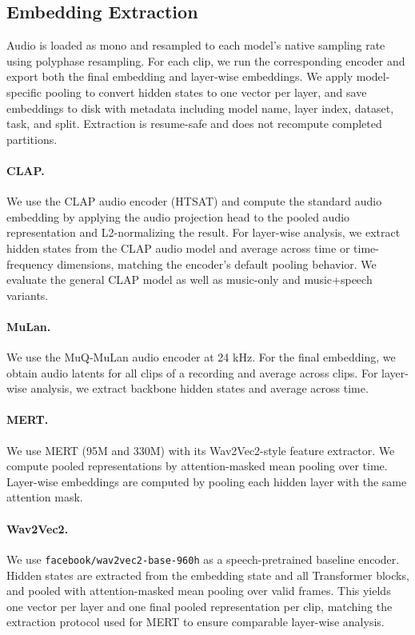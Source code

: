 \subsection{Embedding Extraction}
Audio is loaded as mono and resampled to each model's native sampling rate using polyphase resampling. For each clip, we run the corresponding encoder and export both the final embedding and layer-wise embeddings. We apply model-specific pooling to convert hidden states to one vector per layer, and save embeddings to disk with metadata including model name, layer index, dataset, task, and split. Extraction is resume-safe and does not recompute completed partitions.

\paragraph{CLAP.}
We use the CLAP audio encoder (HTSAT) and compute the standard audio embedding by applying the audio projection head to the pooled audio representation and L2-normalizing the result. For layer-wise analysis, we extract hidden states from the CLAP audio model and average across time or time-frequency dimensions, matching the encoder's default pooling behavior. We evaluate the general CLAP model as well as music-only and music+speech variants.

\paragraph{MuLan.}
We use the MuQ-MuLan audio encoder at 24 kHz. For the final embedding, we obtain audio latents for all clips of a recording and average across clips. For layer-wise analysis, we extract backbone hidden states and average across time.

\paragraph{MERT.}
We use MERT (95M and 330M) with its Wav2Vec2-style feature extractor. We compute pooled representations by attention-masked mean pooling over time. Layer-wise embeddings are computed by pooling each hidden layer with the same attention mask.

\paragraph{Wav2Vec2.}
We use \texttt{facebook/wav2vec2-base-960h} as a speech-pretrained baseline encoder. Hidden states are extracted from the embedding state and all Transformer blocks, and pooled with attention-masked mean pooling over valid frames. This yields one vector per layer and one final pooled representation per clip, matching the extraction protocol used for MERT to ensure comparable layer-wise analysis.

